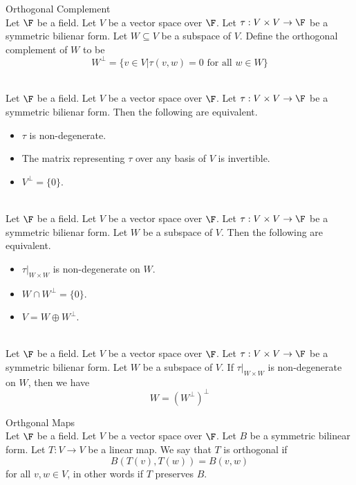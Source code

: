 \documentclass[a4paper]{article}
\begin{document}
\begin{defn}{Orthogonal Complement}{}\\
Let $\F$ be a field. Let $V$ be a vector space over $\F$. Let $\tau:V\times V\to\F$ be a symmetric bilienar form. Let $W\subseteq V$ be a subspace of $V$. Define the orthogonal complement of $W$ to be $$W^{\perp}=\{v\in V|\tau(v,w)=0\text{ for all }w\in W\}$$
\end{defn}

\begin{prp}{}{}\\
Let $\F$ be a field. Let $V$ be a vector space over $\F$. Let $\tau:V\times V\to\F$ be a symmetric bilienar form. Then the following are equivalent. 
\begin{itemize}
\item $\tau$ is non-degenerate. 
\item The matrix representing $\tau$ over any basis of $V$ is invertible. 
\item $V^\perp=\{0\}$. 
\end{itemize}
\end{prp}

\begin{prp}{}{}\\
Let $\F$ be a field. Let $V$ be a vector space over $\F$. Let $\tau:V\times V\to\F$ be a symmetric bilienar form. Let $W$ be a subspace of $V$. Then the following are equivalent. 
\begin{itemize}
\item $\tau|_{W\times W}$ is non-degenerate on $W$. 
\item $W\cap W^\perp=\{0\}$. 
\item $V=W\oplus W^\perp$. 
\end{itemize}
\end{prp}

\begin{prp}{}{}\\
Let $\F$ be a field. Let $V$ be a vector space over $\F$. Let $\tau:V\times V\to\F$ be a symmetric bilienar form. Let $W$ be a subspace of $V$. If $\tau|_{W\times W}$ is non-degenerate on $W$, then we have $$W=(W^\perp)^\perp$$
\end{prp}

\begin{defn}{Orthgonal Maps}{}\\
Let $\F$ be a field. Let $V$ be a vector space over $\F$. Let $B$ be a symmetric bilinear form. Let $T:V\to V$ be a linear map. We say that $T$ is orthogonal if $$B(T(v),T(w))=B(v,w)$$ for all $v,w\in V$, in other words if $T$ preserves $B$. 
\end{defn}
\end{document}
